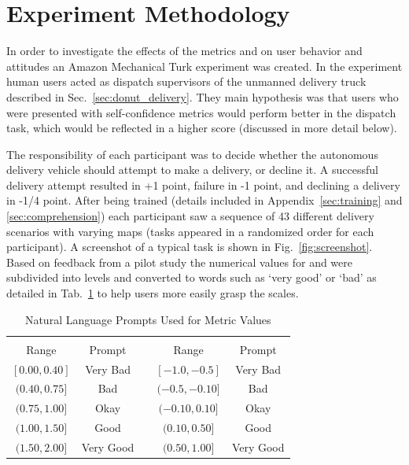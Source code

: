 \section{Experiment Methodology} \label{sec:methodology}
    In order to investigate the effects of the metrics \xQ{} and \xO{} on user behavior and attitudes an Amazon Mechanical Turk experiment was created. In the experiment human users acted as dispatch supervisors of the unmanned delivery truck described in Sec.~\ref{sec:donut_delivery}. They main hypothesis was that users who were presented with self-confidence metrics would perform better in the dispatch task, which would be reflected in a higher score (discussed in more detail below).

    The responsibility of each participant was to decide whether the autonomous delivery vehicle should attempt to make a delivery, or decline it. A successful delivery attempt resulted in +1 point, failure in -1 point, and declining a delivery in -1/4 point. After being trained (details included in Appendix~\ref{sec:training} and \ref{sec:comprehension}) each participant saw a sequence of 43 different delivery scenarios with varying maps (tasks appeared in a randomized order for each participant). A screenshot of a typical task is shown in Fig.~\ref{fig:screenshot}. Based on feedback from a pilot study the numerical values for \xQ{} and \xO{} were subdivided into levels and converted to words such as `very good' or `bad' as detailed in Tab.~\ref{tab:word_ranges} to help users more easily grasp the scales.

    \begin{table}[]
        \caption{Natural Language Prompts Used for Metric Values}
        \label{tab:word_ranges}
        \begin{tabular}{cclcc}
            \multicolumn{2}{c}{\xQ{}} & \vline & \multicolumn{2}{c}{\xO{}} \\
            Range & Prompt & \vline & Range & Prompt \\
            \hline
            $[0.00,0.40]$ & Very Bad & \vline & $[-1.0,-0.5]$ & Very Bad \\
            $(0.40,0.75]$ & Bad & \vline & $(-0.5,-0.10]$ & Bad \\
            $(0.75,1.00]$ & Okay & \vline & $(-0.10,0.10]$ & Okay \\
            $(1.00,1.50]$ & Good & \vline & $(0.10,0.50]$ & Good \\
            $(1.50,2.00]$ & Very Good & \vline & $(0.50,1.00]$ & Very Good
        \end{tabular}
    \end{table}

